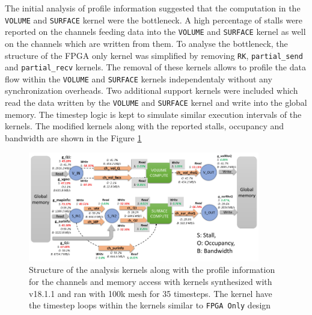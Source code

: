 The initial analysis of profile information suggested that the computation in the
\texttt{VOLUME} and \texttt{SURFACE} kernel were the bottleneck. A high percentage of stalls were
reported on the channels feeding data into the \texttt{VOLUME} and \texttt{SURFACE} kernel as well
on the channels which are written from them. To analyse the bottleneck, the
structure of the FPGA only kernel was simplified by removing \texttt{RK}, \texttt{partial\_send}
and \texttt{partial\_recv} kernels. The removal of these kernels allows to profile
the data flow within the \texttt{VOLUME} and \texttt{SURFACE} kernels independentaly without any
synchronization overheads. Two additional support kernels were included which
read the data written by the \texttt{VOLUME} and \texttt{SURFACE} kernel and write into the
global memory. The timestep logic is kept to simulate similar execution
intervals of the kernels. The modified kernels along with the reported
stalls, occupancy and bandwidth are shown in the Figure \ref{fig:prof_analyis}
\begin{figure}[]%
    \centering
    \includegraphics[width=0.9\textwidth]{images/bottleneck_analysis_2}
    \caption{Structure of the analysis kernels along with the profile
    information for the channels and memory access with kernels synthesized
    with v18.1.1 and ran with 100k mesh for 35 timesteps. The kernel have the timestep
    loops within the kernels similar to \texttt{FPGA Only} design}
    \label{fig:prof_analyis}
\end{figure}

